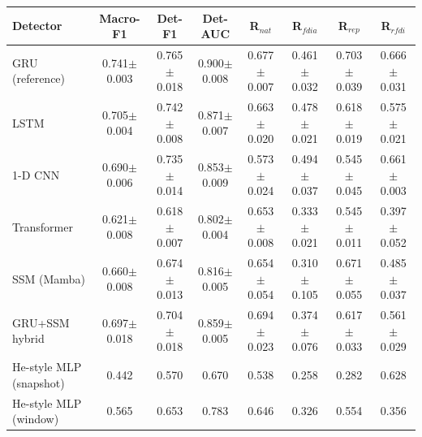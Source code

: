 \begin{tabular}{lccccccc}
\toprule
Detector & Macro-F1 & Det-F1 & Det-AUC & R$_{nat}$ & R$_{fdia}$ & R$_{rep}$ & R$_{rfdi}$ \\
\midrule
GRU (reference) & 0.741$\pm$0.003 & 0.765$\pm$0.018 & 0.900$\pm$0.008 & 0.677$\pm$0.007 & 0.461$\pm$0.032 & 0.703$\pm$0.039 & 0.666$\pm$0.031 \\
LSTM & 0.705$\pm$0.004 & 0.742$\pm$0.008 & 0.871$\pm$0.007 & 0.663$\pm$0.020 & 0.478$\pm$0.021 & 0.618$\pm$0.019 & 0.575$\pm$0.021 \\
1-D CNN & 0.690$\pm$0.006 & 0.735$\pm$0.014 & 0.853$\pm$0.009 & 0.573$\pm$0.024 & 0.494$\pm$0.037 & 0.545$\pm$0.045 & 0.661$\pm$0.003 \\
Transformer & 0.621$\pm$0.008 & 0.618$\pm$0.007 & 0.802$\pm$0.004 & 0.653$\pm$0.008 & 0.333$\pm$0.021 & 0.545$\pm$0.011 & 0.397$\pm$0.052 \\
SSM (Mamba) & 0.660$\pm$0.008 & 0.674$\pm$0.013 & 0.816$\pm$0.005 & 0.654$\pm$0.054 & 0.310$\pm$0.105 & 0.671$\pm$0.055 & 0.485$\pm$0.037 \\
GRU+SSM hybrid & 0.697$\pm$0.018 & 0.704$\pm$0.018 & 0.859$\pm$0.005 & 0.694$\pm$0.023 & 0.374$\pm$0.076 & 0.617$\pm$0.033 & 0.561$\pm$0.029 \\
He-style MLP (snapshot) & 0.442 & 0.570 & 0.670 & 0.538 & 0.258 & 0.282 & 0.628 \\
He-style MLP (window) & 0.565 & 0.653 & 0.783 & 0.646 & 0.326 & 0.554 & 0.356 \\
\bottomrule
\end{tabular}
